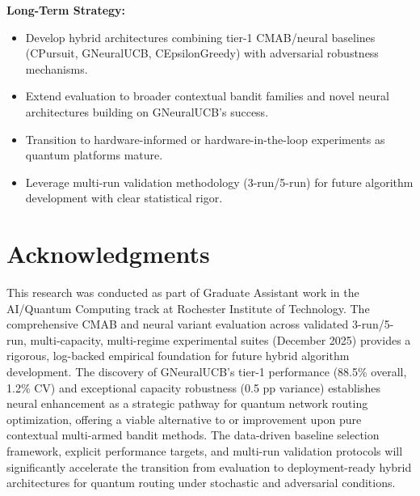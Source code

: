 \documentclass[12pt,a4paper]{article}
\begin{document}
\textbf{Long-Term Strategy:}
\begin{itemize}
\item Develop hybrid architectures combining tier-1 CMAB/neural baselines (CPursuit, GNeuralUCB, CEpsilonGreedy) with adversarial robustness mechanisms.
\item Extend evaluation to broader contextual bandit families and novel neural architectures building on GNeuralUCB's success.
\item Transition to hardware-informed or hardware-in-the-loop experiments as quantum platforms mature.
\item Leverage multi-run validation methodology (3-run/5-run) for future algorithm development with clear statistical rigor.
\end{itemize}

\section{Acknowledgments}

This research was conducted as part of Graduate Assistant work in the AI/Quantum Computing track at Rochester Institute of Technology. The comprehensive CMAB and neural variant evaluation across validated 3-run/5-run, multi-capacity, multi-regime experimental suites (December 2025) provides a rigorous, log-backed empirical foundation for future hybrid algorithm development. The discovery of GNeuralUCB's tier-1 performance (88.5\% overall, 1.2\% CV) and exceptional capacity robustness (0.5 pp variance) establishes neural enhancement as a strategic pathway for quantum network routing optimization, offering a viable alternative to or improvement upon pure contextual multi-armed bandit methods. The data-driven baseline selection framework, explicit performance targets, and multi-run validation protocols will significantly accelerate the transition from evaluation to deployment-ready hybrid architectures for quantum routing under stochastic and adversarial conditions.
\end{document}
